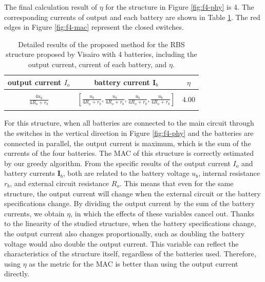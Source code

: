 \documentclass{article}
\begin{document}
The final calculation result of $\eta$ for the structure in Figure \ref{fig:f4-phy} is 4. 
The corresponding currents of output and each battery are shown in Table \ref{tab:1}. 
The red edges in Figure \ref{fig:f4-mac} represent the closed switches.
\begin{table}[h]
    \caption{Detailed results of the proposed method for the RBS structure proposed by Visairo\cite{visairoReconfigurableBatteryPack2008} with 4 batteries, including the output current, current of each battery, and $\eta$.}
    \label{tab:1}
    \begin{tabular}{ccc}
        \hline
        output current $I_o$       & battery current $\bm{I}_b$       & $\eta$        \\ 
        \hline\\
        $\displaystyle\frac{4u_b}{4R_o + r_b}$ &  $\displaystyle\left[\frac{u_b}{4R_o + r_b},\frac{u_b}{4R_o + r_b},\frac{u_b}{4R_o + r_b},\frac{u_b}{4R_o + r_b}\right]$   & $4.00$ \\ 
        \\
        \hline
    \end{tabular}
\end{table}
For this structure, when all batteries are connected to the main circuit through the switches in the vertical direction in Figure \ref{fig:f4-phy} and the batteries are connected in parallel, the output current is maximum, which is the sum of the currents of the four batteries. 
The MAC of this structure is correctly estimated by our greedy algorithm.
From the specific results of the output current $I_o$ and battery currents $\bm{I}_b$, both are related to the battery voltage $u_b$, internal resistance $r_b$, and external circuit resistance $R_o$. 
This means that even for the same structure, the output current will change when the external circuit  or the battery specifications  change. 
By dividing the output current by the sum of the battery currents, we obtain $\eta$, in which the effects of these variables cancel out.
Thanks to the linearity of the studied structure, when the battery specifications change, the output current also changes proportionally, such as doubling the battery voltage would also double the output current. 
This variable can reflect the characteristics of the structure itself, regardless of the batteries used. 
Therefore, using $\eta$ as the metric for the MAC is better than using the output current directly.
\end{document}
